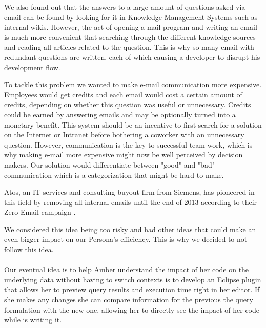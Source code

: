 We also found out that the answers to a large amount of questions asked via email can be found by looking for it in Knowledge Management Systems such as internal wikis. However, the act of opening a mail program and writing an email is much more convenient that searching through the different knowledge sources and reading all articles related to the question. This is why so many email with redundant questions are written, each of which causing a developer to disrupt his development flow.

To tackle this problem we wanted to make e-mail communication more expensive. Employees would get credits and each email would cost a certain amount of credits, depending on whether this question was useful or unnecessary. Credits could be earned by answering emails and may be optionally turned into a monetary benefit.
This system should be an incentive to first search for a solution on the Internet or Intranet before bothering a coworker with an unnecessary question.
However, communication is the key to successful team work, which is why making e-mail more expensive might now be well perceived by decision makers. Our solution would differentiate between "good" and "bad" communication which is a categorization that might be hard to make.

Atos, an IT services and consulting buyout firm from Siemens, has pioneered in this field by removing all internal emails until the end of 2013 according to their Zero Email campaign \cite{zero_email}.

We considered this idea being too risky and had other ideas that could make an even bigger impact on our Persona's efficiency. This is why we decided to not follow this idea.

\paragraph{}
Our eventual idea is to help Amber understand the impact of her code on the underlying data without having to switch contexts is to develop an Eclipse plugin that allows her to preview query results and execution time right in her editor. If she makes any changes she can compare information for the previous the query formulation with the new one, allowing her to directly see the impact of her code while is writing it.